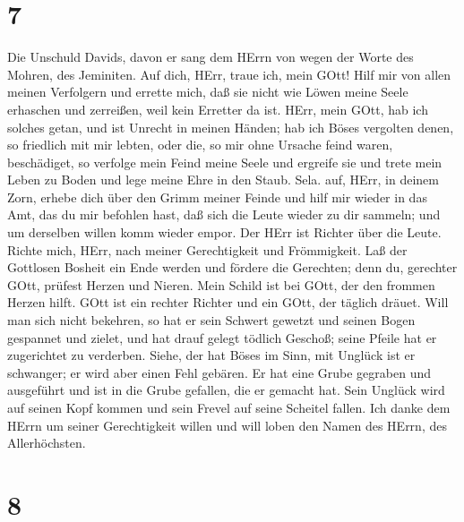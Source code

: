 \hypertarget{section-6}{%
\section{7}\label{section-6}}

 Die Unschuld Davids, davon er sang dem HErrn von wegen der
Worte des Mohren, des Jeminiten.  Auf dich, HErr, traue ich,
mein GOtt! Hilf mir von allen meinen Verfolgern und errette mich,
 daß sie nicht wie Löwen meine Seele erhaschen und
zerreißen, weil kein Erretter da ist.  HErr, mein GOtt, hab
ich solches getan, und ist Unrecht in meinen Händen;  hab
ich Böses vergolten denen, so friedlich mit mir lebten, oder die, so mir
ohne Ursache feind waren, beschädiget,  so verfolge mein
Feind meine Seele und ergreife sie und trete mein Leben zu Boden und
lege meine Ehre in den Staub. Sela.  auf, HErr, in deinem
Zorn, erhebe dich über den Grimm meiner Feinde und hilf mir wieder in
das Amt, das du mir befohlen hast,  daß sich die Leute
wieder zu dir sammeln; und um derselben willen komm wieder empor.
 Der HErr ist Richter über die Leute. Richte mich, HErr,
nach meiner Gerechtigkeit und Frömmigkeit.  Laß der
Gottlosen Bosheit ein Ende werden und fördere die Gerechten; denn du,
gerechter GOtt, prüfest Herzen und Nieren.  Mein Schild ist
bei GOtt, der den frommen Herzen hilft.  GOtt ist ein
rechter Richter und ein GOtt, der täglich dräuet.  Will man
sich nicht bekehren, so hat er sein Schwert gewetzt und seinen Bogen
gespannet und zielet,  und hat drauf gelegt tödlich
Geschoß; seine Pfeile hat er zugerichtet zu verderben. 
Siehe, der hat Böses im Sinn, mit Unglück ist er schwanger; er wird aber
einen Fehl gebären.  Er hat eine Grube gegraben und
ausgeführt und ist in die Grube gefallen, die er gemacht hat.
 Sein Unglück wird auf seinen Kopf kommen und sein Frevel
auf seine Scheitel fallen.  Ich danke dem HErrn um seiner
Gerechtigkeit willen und will loben den Namen des HErrn, des
Allerhöchsten.

\hypertarget{section-7}{%
\section{8}\label{section-7}}

